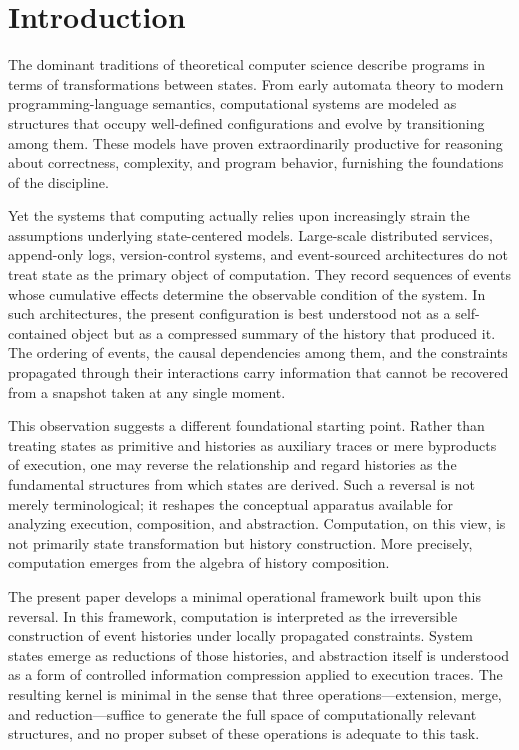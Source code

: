 \documentclass[12pt]{article}
\begin{document}

\section*{Introduction}

The dominant traditions of theoretical computer science describe programs in terms of
transformations between states. From early automata theory to modern programming-language
semantics, computational systems are modeled as structures that occupy well-defined
configurations and evolve by transitioning among them. These models have proven extraordinarily
productive for reasoning about correctness, complexity, and program behavior, furnishing the
foundations of the discipline.

Yet the systems that computing actually relies upon increasingly strain the assumptions
underlying state-centered models. Large-scale distributed services, append-only logs,
version-control systems, and event-sourced architectures do not treat state as the primary
object of computation. They record sequences of events whose cumulative effects determine the
observable condition of the system. In such architectures, the present configuration is best
understood not as a self-contained object but as a compressed summary of the history that
produced it. The ordering of events, the causal dependencies among them, and the constraints
propagated through their interactions carry information that cannot be recovered from a snapshot
taken at any single moment.

This observation suggests a different foundational starting point. Rather than treating states
as primitive and histories as auxiliary traces or mere byproducts of execution, one may reverse
the relationship and regard histories as the fundamental structures from which states are
derived. Such a reversal is not merely terminological; it reshapes the conceptual apparatus
available for analyzing execution, composition, and abstraction. Computation, on this view, is
not primarily state transformation but history construction. More precisely, computation emerges
from the algebra of history composition.

The present paper develops a minimal operational framework built upon this reversal. In this
framework, computation is interpreted as the irreversible construction of event histories under
locally propagated constraints. System states emerge as reductions of those histories, and
abstraction itself is understood as a form of controlled information compression applied to
execution traces. The resulting kernel is minimal in the sense that three operations---extension,
merge, and reduction---suffice to generate the full space of computationally relevant structures,
and no proper subset of these operations is adequate to this task.
\end{document}
